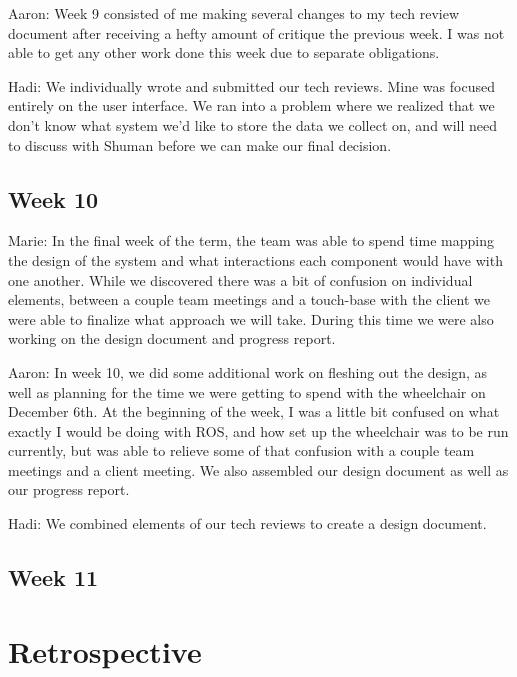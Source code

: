 \documentclass[onecolumn, draftclsnofoot,10pt, compsoc]{IEEEtran}
\begin{document}
Aaron: Week 9 consisted of me making several changes to my tech review document after receiving a hefty amount of critique the previous week. I was not able to get any other work done this week due to separate obligations.\par

Hadi: We individually wrote and submitted our tech reviews. Mine was focused entirely on the user interface. We ran into a problem where we realized that we don't know what system we'd like to store the data we collect on, and will need to discuss with Shuman before we can make our final decision.\par

\subsection{Week 10}
Marie: In the final week of the term, the team was able to spend time mapping the design of the system and what interactions each component would have with one another. While we discovered there was a bit of confusion on individual elements, between a couple team meetings and a touch-base with the client we were able to finalize what approach we will take. During this time we were also working on the design document and progress report.\par

Aaron: In week 10, we did some additional work on fleshing out the design, as well as planning for the time we were getting to spend with the wheelchair on December 6th. At the beginning of the week, I was a little bit confused on what exactly I would be doing with ROS, and how set up the wheelchair was to be run currently, but was able to relieve some of that confusion with a couple team meetings and a client meeting. We also assembled our design document as well as our progress report.\par

Hadi: We combined elements of our tech reviews to create a design document.\par

\subsection{Week 11}

\section{Retrospective}
\end{document}
